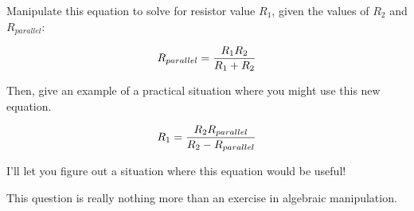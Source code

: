 

Manipulate this equation to solve for resistor value $R_1$, given the values of $R_2$ and $R_{parallel}$:

$$R_{parallel} = {{R_1 R_2} \over {R_1 + R_2}}$$

Then, give an example of a practical situation where you might use this new equation.







$$R_1 = {{R_2 R_{parallel}} \over {R_2 - R_{parallel}}}$$

I'll let you figure out a situation where this equation would be useful!







This question is really nothing more than an exercise in algebraic manipulation.




